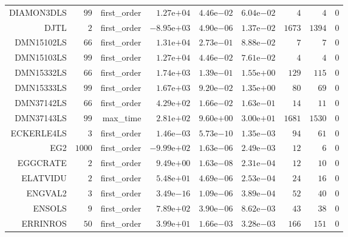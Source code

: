 \begin{longtable}{rrrrrrrrr}
DIAMON3DLS & \(    99\) & first\_order & \( 1.27\)e\(+04\) & \( 4.46\)e\(-02\) & \( 6.04\)e\(-02\) & \(     4\) & \(     4\) & \(     0\) \\
DJTL & \(     2\) & first\_order & \(-8.95\)e\(+03\) & \( 4.90\)e\(-06\) & \( 1.37\)e\(-02\) & \(  1673\) & \(  1394\) & \(     0\) \\
DMN15102LS & \(    66\) & first\_order & \( 1.31\)e\(+04\) & \( 2.73\)e\(-01\) & \( 8.88\)e\(-02\) & \(     7\) & \(     7\) & \(     0\) \\
DMN15103LS & \(    99\) & first\_order & \( 1.27\)e\(+04\) & \( 4.46\)e\(-02\) & \( 7.61\)e\(-02\) & \(     4\) & \(     4\) & \(     0\) \\
DMN15332LS & \(    66\) & first\_order & \( 1.74\)e\(+03\) & \( 1.39\)e\(-01\) & \( 1.55\)e\(+00\) & \(   129\) & \(   115\) & \(     0\) \\
DMN15333LS & \(    99\) & first\_order & \( 1.67\)e\(+03\) & \( 9.20\)e\(-02\) & \( 1.35\)e\(+00\) & \(    80\) & \(    69\) & \(     0\) \\
DMN37142LS & \(    66\) & first\_order & \( 4.29\)e\(+02\) & \( 1.66\)e\(-02\) & \( 1.63\)e\(-01\) & \(    14\) & \(    11\) & \(     0\) \\
DMN37143LS & \(    99\) & max\_time & \( 2.81\)e\(+02\) & \( 9.60\)e\(+00\) & \( 3.00\)e\(+01\) & \(  1681\) & \(  1530\) & \(     0\) \\
ECKERLE4LS & \(     3\) & first\_order & \( 1.46\)e\(-03\) & \( 5.73\)e\(-10\) & \( 1.35\)e\(-03\) & \(    94\) & \(    61\) & \(     0\) \\
EG2 & \(  1000\) & first\_order & \(-9.99\)e\(+02\) & \( 1.63\)e\(-06\) & \( 2.49\)e\(-03\) & \(    12\) & \(     6\) & \(     0\) \\
EGGCRATE & \(     2\) & first\_order & \( 9.49\)e\(+00\) & \( 1.63\)e\(-08\) & \( 2.31\)e\(-04\) & \(    12\) & \(    10\) & \(     0\) \\
ELATVIDU & \(     2\) & first\_order & \( 5.48\)e\(+01\) & \( 4.69\)e\(-06\) & \( 2.53\)e\(-04\) & \(    24\) & \(    16\) & \(     0\) \\
ENGVAL2 & \(     3\) & first\_order & \( 3.49\)e\(-16\) & \( 1.09\)e\(-06\) & \( 3.89\)e\(-04\) & \(    52\) & \(    40\) & \(     0\) \\
ENSOLS & \(     9\) & first\_order & \( 7.89\)e\(+02\) & \( 3.90\)e\(-06\) & \( 8.62\)e\(-03\) & \(    43\) & \(    38\) & \(     0\) \\
ERRINROS & \(    50\) & first\_order & \( 3.99\)e\(+01\) & \( 1.66\)e\(-03\) & \( 3.28\)e\(-03\) & \(   166\) & \(   151\) & \(     0\) \\

\end{longtable}
